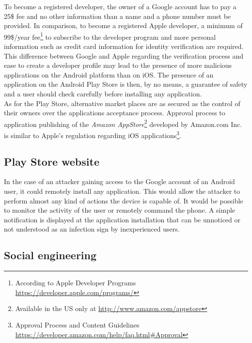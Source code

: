 To become a registered developer, the owner of a Google account has to pay a 25\$ fee and no other information than a name and a phone number must be provided.
In comparison, to become a registered Apple developer, a minimum of 99\$/year fee\footnote{According to Apple Developer Programs \url{https://developer.apple.com/programs/}} to subscribe to the developer program and more personal information such as credit card information for identity verification are required.\\

This difference between Google and Apple regarding the verification process and ease to create a developer profile  may lead to the presence of more malicious applications on the Android platform than on iOS.
The presence of an application on the Android Play Store is then, by no means, a guarantee of safety and a user should check carefully before installing any application.\\

As for the Play Store, alternative market places are as secured as the control of their owners over the applications acceptance process.
Approval process to application publishing of the \emph{Amazon AppStore}\footnote{Available in the US only at \url{http://www.amazon.com/appstore}} developed by Amazon.com Inc. is  similar to Apple's regulation regarding iOS applications\footnote{Approval Process and Content Guidelines \url{https://developer.amazon.com/help/faq.html\#Approval}}.

\subsection{Play Store website}

In the case of an attacker gaining access to the Google account of an Android user, it could remotely install any application.
This would allow the attacker to perform almost any kind of actions the device is capable of.
It would be possible to monitor the activity of the user or remotely command the phone.
A simple notification is displayed at the application installation that can be unnoticed or not understood as an infection sign by inexperienced users.

\subsection{Social engineering}


